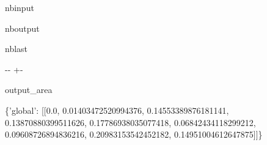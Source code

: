 \documentclass[letterpaper,10pt,english]{sphinxmanual}
\begin{document}
\begin{sphinxuseclass}{nbinput}
{
\begin{sphinxVerbatim}[commandchars=\\\{\}]
\llap{\color{nbsphinxin}[3]:\,\hspace{\fboxrule}\hspace{\fboxsep}}         

   


\end{sphinxVerbatim}
}

\end{sphinxuseclass}
\begin{sphinxuseclass}{nboutput}
\begin{sphinxuseclass}{nblast}
{

\kern-\sphinxverbatimsmallskipamount\kern-\baselineskip
\kern+\FrameHeightAdjust\kern-\fboxrule
\vspace{\nbsphinxcodecellspacing}

\begin{sphinxuseclass}{output_area}
\begin{sphinxuseclass}{}


\begin{sphinxVerbatim}[commandchars=\\\{\}]
\{'global': [[0.0, 0.01403472520994376, 0.14553389876181141, 0.13870880399511626, 0.17786938035077418, 0.06842434118299212, 0.09608726894836216, 0.20983153542452182, 0.14951004612647875]]\}
\end{sphinxVerbatim}



\end{sphinxuseclass}
\end{sphinxuseclass}
}

\end{sphinxuseclass}
\end{sphinxuseclass}
\end{document}
